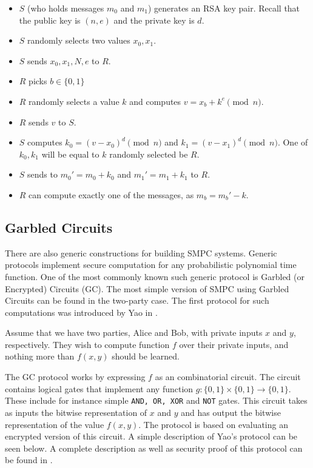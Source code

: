 \begin{itemize}
  \item $S$ (who holds messages $m_0$ and $m_1$) generates an RSA key pair. Recall that the public key is $(n,e)$ and the private key is $d$.
  \item $S$ randomly selects two values $x_0, x_1$.
  \item $S$ sends $x_0, x_1, N, e$ to $R$.
  \item $R$ picks $b \in \{0,1\}$
  \item $R$ randomly selects a value $k$ and computes $v = x_b + k^e \pmod{n}$.
  \item $R$ sends $v$ to $S$.
  \item $S$ computes $k_0 = (v-x_0)^d \pmod{n}$ and $k_1 = (v-x_1)^d \pmod{n}$. One of $k_0, k_1$ will be equal to $k$ randomly selected be $R$.
  \item $S$ sends to $m_0' = m_0 + k_0$ and $m_1' = m_1 + k_1$ to $R$.
  \item $R$ can compute exactly one of the messages, as $m_b = m_b' - k$.
\end{itemize}

\subsection{Garbled Circuits}
There are also generic constructions for building SMPC systems.
Generic protocols implement secure computation for any probabilistic polynomial time function.
One of the most commonly known such generic protocol is Garbled (or Encrypted) Circuits (GC).
The most simple version of SMPC using Garbled Circuits can be found in the two-party case.
The first protocol for such computations was introduced by Yao in \cite{yao1986generate}.

Assume that we have two parties, Alice and Bob, with private inputs $x$ and $y$, respectively.
They wish to compute function $f$ over their private inputs, and nothing more than $f(x,y)$ should be learned.

The GC protocol works by expressing $f$ as an combinatorial circuit.
The circuit contains logical gates that implement any function $g : \{0,1\} \times \{0,1\} \rightarrow \{0,1\}$.
These include for instance simple \texttt{AND, OR, XOR} and \texttt{NOT} gates.
This circuit takes as inputs the bitwise representation of $x$ and $y$ and has output the bitwise representation of the value $f(x,y)$.
The protocol is based on evaluating an encrypted version of this circuit.
A simple description of Yao's protocol can be seen below. A complete description as well as security proof of this protocol can be found in \cite{lindell2009proof}.

